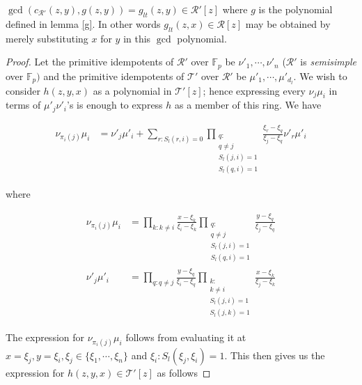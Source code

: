 	\begin{lemma}
		$\gcd(c_{\mathcal{R}'}(z,y),g(z,y)) = g_{lt}(z,y) \in \mathcal{R}'[z]$ where $g$ is the polynomial defined in lemma \ref{g}. In other words $g_{lt}(z,x) \in \mathcal{R}[z]$ may be obtained by merely substituting $x$
		for $y$ in this $\gcd$ polynomial.
	\end{lemma}


	\begin{proof}
		Let the primitive idempotents of $\mathcal{R}'$ over $\mathbb{F}_p$ be $\nu'_1,\cdots,\nu'_n$ ($\mathcal{R}'$ is \emph{semisimple} over $\mathbb{F}_p)$ and the primitive idempotents of $\mathcal{T}'$ over 
		$\mathcal{R}'$ be $\mu'_1,\cdots,\mu'_{d_l}$. We wish to consider $h(z,y,x)$ as a polynomial in $\mathcal{T}'[z]$; hence expressing every $\nu_{j} \mu_i$ in terms of $\mu'_j\nu'_i$'s is enough to express $h$
		as a member of this ring. We have

		\begin{align*}
			\nu_{\pi_i(j)}\mu_i &= \nu'_{j}\mu'_{i} + \sum_{r:S_l(r,i)=0} 
			\prod_{\substack{
												 q: \\
												 q \neq j \\
												 S_l(j,i)=1 \\
											 S_l(q,i)=1}} 
											 \frac{\xi_r-\xi_q}{\xi_j-\xi_q} 
											 \nu'_r\mu'_i
		\end{align*}

		where  

		\begin{align*}
			\nu_{\pi_i(j)}\mu_i &= \prod_{k:k\neq i} \frac{x-\xi_k}{\xi_i-\xi_k}\prod_{\substack{
													     q: \\
													     q \neq j\\
													     S_l(j,i)=1\\
													     S_l(q,i)=1}} \frac{y-\xi_q}{\xi_j-\xi_q}\\
			\nu'_j\mu'_i &= \prod_{q:q\neq j} \frac{y-\xi_q}{\xi_i-\xi_q} \prod_{\substack{
													k:\\
													k \neq i\\
												        S_l(j,i)=1\\
												S_l(j,k)=1}} \frac{x-\xi_k}{\xi_j-\xi_k}
		\end{align*}

		The expression for $\nu_{\pi_i(j)}{\mu_i}$ follows from evaluating it at $x=\xi_j,y=\xi_i,\xi_j \in \{\xi_1,\cdots,\xi_n\}$ and $\xi_i:S_l(\xi_j,\xi_i)=1$. This then gives us the expression for $h(z,y,x) \in 
		\mathcal{T}'[z]$ as follows


\end{proof}
